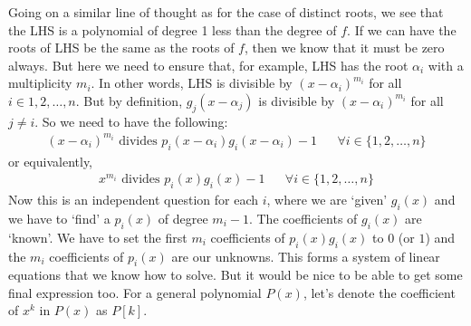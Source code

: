 \documentclass{article}
\begin{document}
Going on a similar line of thought as for the case of distinct roots, we see that the LHS is a polynomial of degree 1 less than the degree of $f$. If we can have the roots of LHS be the same as the roots of $f$, then we know that it must be zero always. But here we need to ensure that, for example, LHS has the root $\alpha_i$ with a multiplicity $m_i$. In other words, LHS is divisible by $(x-\alpha_i)^{m_i}$ for all $i \in {1,2,\dots,n}$. But by definition, $g_j(x-\alpha_j)$ is divisible by $(x-\alpha_i)^{m_i}$ for all $j \neq i$. So we need to have the following:
\begin{align}
    (x-\alpha_i)^{m_i} \textrm{ divides } p_i(x-\alpha_i)g_i(x-\alpha_i) - 1 && \forall i \in \{1,2,\dots,n\}
\end{align}
or equivalently,
\begin{align}
    x^{m_i} \textrm{ divides } p_i(x)g_i(x) - 1 && \forall i \in \{1,2,\dots,n\}
\end{align}
Now this is an independent question for each $i$, where we are `given' $g_i(x)$ and we have to `find' a $p_i(x)$ of degree $m_i - 1$. The coefficients of $g_i(x)$ are `known'. We have to set the first $m_i$ coefficients of $p_i(x)g_i(x)$ to $0$ (or $1$) and the $m_i$ coefficients of $p_i(x)$ are our unknowns. This forms a system of linear equations that we know how to solve. But it would be nice to be able to get some final expression too. For a general polynomial $P(x)$, let's denote the coefficient of $x^k$ in $P(x)$ as $P[k]$.
\end{document}
